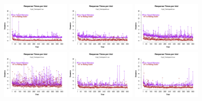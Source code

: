 \begin{figure}[th]
\includegraphics[width=0.30\textwidth]{Figures/RTs_Exp2_P7} \includegraphics[width=0.30\textwidth]{Figures/RTs_Exp2_P8} \includegraphics[width=0.30\textwidth]{Figures/RTs_Exp2_P9}
\includegraphics[width=0.30\textwidth]{Figures/RTs_Exp2_P10} \includegraphics[width=0.30\textwidth]{Figures/RTs_Exp2_P11} \includegraphics[width=0.30\textwidth]{Figures/RTs_Exp2_P12}

\end{figure}
